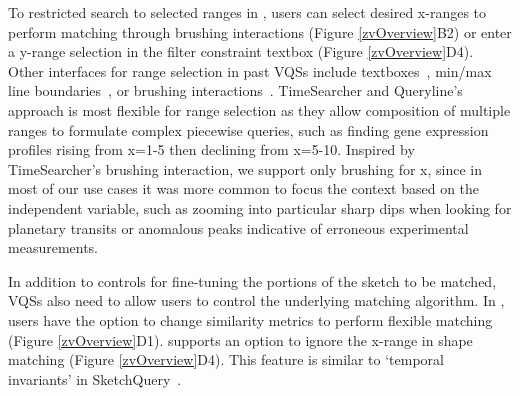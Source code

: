 {  \item To restricted search to selected ranges in \zvpp, users can select desired x-ranges to perform matching through brushing interactions (Figure \ref{zvOverview}B2) or enter a y-range selection in the filter constraint textbox (Figure \ref{zvOverview}D4). Other interfaces for range selection in past VQSs
  include textboxes~\cite{wattenberg2001sketching,Mannino2018}, min/max line boundaries~\cite{ryall2005querylines},
  or brushing interactions~\cite{Hochheiser2001}. TimeSearcher and Queryline's approach is most flexible for range selection as
  they allow composition of multiple ranges to formulate complex piecewise queries, such as finding gene expression profiles
  rising from x=1-5 then declining from x=5-10. Inspired by TimeSearcher's brushing interaction, we support only brushing for x, since in most of our use cases it was more common to focus the context based on the independent variable, such as zooming into particular sharp dips when looking for planetary transits or anomalous peaks indicative of erroneous experimental measurements.
  \item  In addition to controls for fine-tuning the portions of the sketch to be matched, VQSs also need to allow users to control the underlying matching algorithm. In \zvpp, users have the option to change similarity metrics to perform flexible matching (Figure \ref{zvOverview}D1). \zvpp supports an option to ignore the x-range in shape matching (Figure \ref{zvOverview}D4). This feature is similar to `temporal invariants' in SketchQuery~\cite{correll2016semantics}.
  \enumend
}
